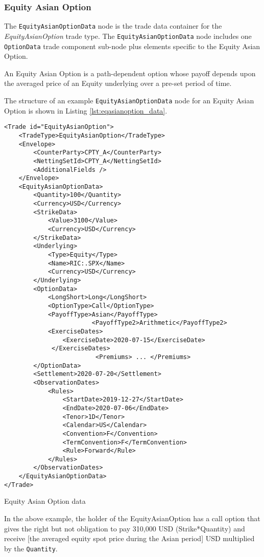 \subsubsection{Equity Asian Option}

The \lstinline!EquityAsianOptionData!  node is the trade data container for the \emph{EquityAsianOption} trade type. 
The \lstinline!EquityAsianOptionData!  node includes one  \lstinline!OptionData! trade component sub-node plus elements
specific to the Equity Asian Option. 

An Equity Asian Option is a path-dependent option whose payoff depends upon the averaged price of an Equity underlying 
over a pre-set period of time.

The structure of an example \lstinline!EquityAsianOptionData! node for an Equity Asian Option is shown in Listing
\ref{lst:eqasianoption_data}.

\begin{listing}[H]
	\begin{verbatim}
<Trade id="EquityAsianOption">
	<TradeType>EquityAsianOption</TradeType>
	<Envelope>
		<CounterParty>CPTY_A</CounterParty>
		<NettingSetId>CPTY_A</NettingSetId>
		<AdditionalFields />
	</Envelope>
	<EquityAsianOptionData>
		<Quantity>100</Quantity>
		<Currency>USD</Currency>
		<StrikeData>
			<Value>3100</Value>
			<Currency>USD</Currency>
		</StrikeData>
		<Underlying>
			<Type>Equity</Type>
			<Name>RIC:.SPX</Name>
			<Currency>USD</Currency>
		</Underlying>
		<OptionData>
			<LongShort>Long</LongShort>
			<OptionType>Call</OptionType>
			<PayoffType>Asian</PayoffType>
                        <PayoffType2>Arithmetic</PayoffType2>
			<ExerciseDates>
				<ExerciseDate>2020-07-15</ExerciseDate>
			 </ExerciseDates>
                         <Premiums> ... </Premiums>       
		</OptionData>
		<Settlement>2020-07-20</Settlement>
		<ObservationDates>
			<Rules>
				<StartDate>2019-12-27</StartDate>
				<EndDate>2020-07-06</EndDate>
				<Tenor>1D</Tenor>
				<Calendar>US</Calendar>
				<Convention>F</Convention>
				<TermConvention>F</TermConvention>
				<Rule>Forward</Rule>
			</Rules>
		</ObservationDates>
	</EquityAsianOptionData>
</Trade>
\end{verbatim}
\caption{Equity Asian Option data}
\label{lst:eqasianoption_data}
\end{listing}

In the above example, the holder of the EquityAsianOption has a call option that gives the right but not obligation to pay 310,000 USD (Strike*Quantity) and receive [the averaged equity spot price during the Asian period] USD multiplied by the \lstinline!Quantity!.  

